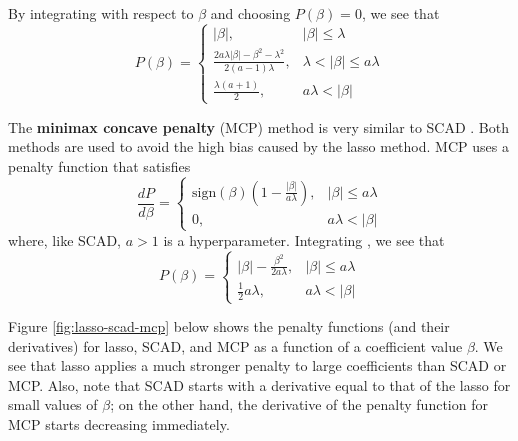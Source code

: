\documentclass{article}
\newcommand{\sign}{\text{sign}}
\begin{document}
By integrating with respect to $\beta$ \cite{breheny2016lasso} and choosing $P(\beta) = 0$, we see that
\begin{equation}
	P(\beta) = \left\{\begin{array}{ll}
		\vert \beta \vert,&\vert \beta \vert \leq \lambda\\
		\frac{2a\lambda\vert\beta\vert - \beta^2-\lambda^2}{2(a - 1)\lambda},&\lambda < \vert \beta \vert \leq a\lambda\\
		\frac{\lambda(a + 1)}{2},&a\lambda < \vert \beta \vert
	\end{array}\right.
\end{equation}

The \textbf{minimax concave penalty} (MCP) method is very similar to SCAD \cite{zhang2010nearly}. Both methods are used to avoid the high bias caused by the lasso method. MCP uses a penalty function that satisfies
\begin{equation}
	\frac{dP}{d\beta} = \left\{\begin{array}{ll}
		\sign(\beta)\left(1 - \frac{\vert \beta \vert}{a\lambda}\right),& \vert \beta \vert \leq a\lambda\\
		0,&a\lambda < \vert \beta \vert
	\end{array}\right.
\end{equation}
where, like SCAD, $a>1$ is a hyperparameter. Integrating \cite{breheny2016lasso}, we see that
\begin{equation}
	P(\beta) = \left\{\begin{array}{ll}
		\vert \beta \vert - \frac{\beta^2}{2a\lambda},&\vert \beta \vert \leq a\lambda\\
		\frac{1}{2}a\lambda,&a\lambda < \vert \beta \vert
	\end{array}\right.
\end{equation}

Figure \ref{fig:lasso-scad-mcp} below shows the penalty functions (and their derivatives) for lasso, SCAD, and MCP as a function of a coefficient value $\beta$. We see that lasso applies a much stronger penalty to large coefficients than SCAD or MCP. Also, note that SCAD starts with a derivative equal to that of the lasso for small values of $\beta$; on the other hand, the derivative of the penalty function for MCP starts decreasing immediately.
\end{document}
